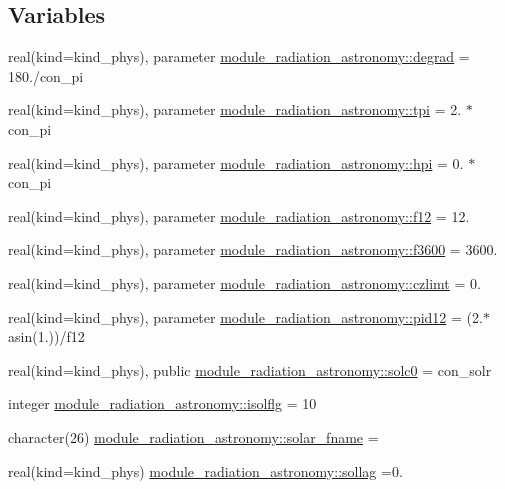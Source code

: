 \subsection*{Variables}
\begin{DoxyCompactItemize}
\item 
real(kind=kind\+\_\+phys), parameter \hyperlink{group__module__radiation__astronomy_ga220d2b997b3073cf2985d62111c5405d}{module\+\_\+radiation\+\_\+astronomy\+::degrad} = 180./con\+\_\+pi
\item 
real(kind=kind\+\_\+phys), parameter \hyperlink{group__module__radiation__astronomy_ga4fbf4be04e17f1f8d0674ee2e20506b0}{module\+\_\+radiation\+\_\+astronomy\+::tpi} = 2. $\ast$ con\+\_\+pi
\item 
real(kind=kind\+\_\+phys), parameter \hyperlink{group__module__radiation__astronomy_ga7369d8561566f5e7e51ccc40e09f2520}{module\+\_\+radiation\+\_\+astronomy\+::hpi} = 0. $\ast$ con\+\_\+pi
\item 
real(kind=kind\+\_\+phys), parameter \hyperlink{group__module__radiation__astronomy_gad59856e8f877eb05a6b22610f14a391d}{module\+\_\+radiation\+\_\+astronomy\+::f12} = 12.
\item 
real(kind=kind\+\_\+phys), parameter \hyperlink{group__module__radiation__astronomy_ga37b491dde50d06e339effb4a31d9f245}{module\+\_\+radiation\+\_\+astronomy\+::f3600} = 3600.
\item 
real(kind=kind\+\_\+phys), parameter \hyperlink{group__module__radiation__astronomy_gafeb2fccbe8137de6099a09035762ff5e}{module\+\_\+radiation\+\_\+astronomy\+::czlimt} = 0.
\item 
real(kind=kind\+\_\+phys), parameter \hyperlink{group__module__radiation__astronomy_gadbf9cdfc7b55d882f015a4bc4ef276ab}{module\+\_\+radiation\+\_\+astronomy\+::pid12} = (2.$\ast$asin(1.))/f12
\item 
real(kind=kind\+\_\+phys), public \hyperlink{group__module__radiation__astronomy_ga37e08872f67023b11f839ac15151af09}{module\+\_\+radiation\+\_\+astronomy\+::solc0} = con\+\_\+solr
\item 
integer \hyperlink{group__module__radiation__astronomy_ga7ea431b6d4f4d6ee1f6545d6baeee44f}{module\+\_\+radiation\+\_\+astronomy\+::isolflg} = 10
\item 
character(26) \hyperlink{group__module__radiation__astronomy_ga05ee7e378d38b90242738b9bf6c40c00}{module\+\_\+radiation\+\_\+astronomy\+::solar\+\_\+fname} = \textquotesingle{} \textquotesingle{}
\item 
real(kind=kind\+\_\+phys) \hyperlink{group__module__radiation__astronomy_ga264a011aa71fb670339ac555dc24e486}{module\+\_\+radiation\+\_\+astronomy\+::sollag} =0.

\end{DoxyCompactItemize}
